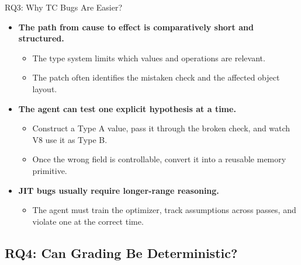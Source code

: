 \documentclass[aspectratio=169,t]{beamer}
\begin{document}
\begin{frame}{RQ3: Why TC Bugs Are Easier?}
  \begin{itemize}
    \item \textbf{The path from cause to effect is comparatively short and structured.}
      \begin{itemize}
        \item The type system limits which values and operations are relevant.
        \item The patch often identifies the mistaken check and the affected object layout.
      \end{itemize}
    \item \textbf{The agent can test one explicit hypothesis at a time.}
      \begin{itemize}
        \item Construct a Type A value, pass it through the broken check, and watch V8 use it as Type B.
        \item Once the wrong field is controllable, convert it into a reusable memory primitive.
      \end{itemize}
    \item \textbf{JIT bugs usually require longer-range reasoning.}
      \begin{itemize}
        \item The agent must train the optimizer, track assumptions across passes, and violate one at the correct time.
      \end{itemize}
  \end{itemize}
\end{frame}

\subsection{RQ4: Can Grading Be Deterministic?}
\end{document}
